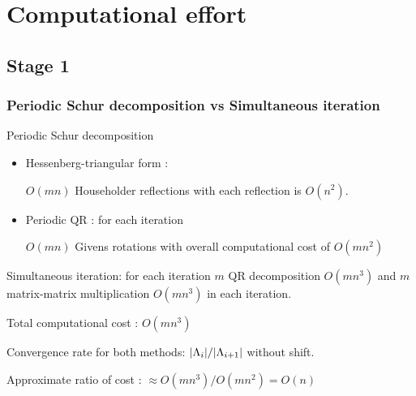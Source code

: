 \documentclass[mathserif, handout]{beamer}
\begin{document}
\section{Computational effort}

\subsection{Stage 1}

\begin{frame}
  \frametitle{Periodic Schur decomposition vs Simultaneous iteration}
  \begin{block}{Periodic Schur decomposition}

    \begin{itemize}
    \item {\color{cyan} Hessenberg-triangular form} :

      $O(mn)$ Householder reflections
      with each reflection is $O(n^{2})$.
    \item {\color{cyan} Periodic QR} : for each iteration

      $O(mn)$
      Givens rotations with overall computational cost of $O(mn^{2})$
    \end{itemize}
  \end{block}

  \pause

  \begin{block}{  Simultaneous iteration: for each iteration}
    $m$ {\color{cyan} QR decomposition}
    $O(mn^{3})$ and $m$ {\color{cyan} matrix-matrix multiplication}
    $O(mn^{3})$ in each iteration.

    Total computational cost : $O(mn^{3})$
  \end{block}

  \pause

  Convergence  rate for both methods:
  $|\Lambda_{i}|/|\Lambda_{i+1}|$  without shift.

  Approximate ratio of cost : $\approx O(mn^3)/O(mn^2) = O(n)$

\end{frame}
\end{document}
